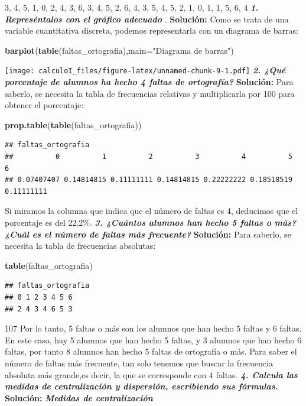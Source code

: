 \documentclass[12pt,]{report}
\newenvironment{Shaded}{\begin{snugshade}}{\end{snugshade}}
\newcommand{\DataTypeTok}[1]{\textcolor[rgb]{0.13,0.29,0.53}{#1}}
\newcommand{\KeywordTok}[1]{\textcolor[rgb]{0.13,0.29,0.53}{\textbf{#1}}}
\newcommand{\NormalTok}[1]{#1}
\newcommand{\StringTok}[1]{\textcolor[rgb]{0.31,0.60,0.02}{#1}}
\theoremstyle{slplain}
\begin{document}
3, 4, 5, 1, 0, 2, 4, 3, 6, 3, 4, 5, 2, 6, 4, 3, 5, 4, 5, 2, 1, 0, 1, 1, 5, 6, 4
\textbf{\emph{1. Represéntalos con el gráfico adecuado}} .
\textbf{Solución:}
Como se trata de una variable cuantitativa discreta, podemos representarla con un diagrama
de barras:

\begin{Shaded}
\begin{Highlighting}[]
\KeywordTok{barplot}\NormalTok{(}\KeywordTok{table}\NormalTok{(faltas_ortografia),}\DataTypeTok{main=}\StringTok{"Diagrama de barras"}\NormalTok{)}
\end{Highlighting}
\end{Shaded}

\texttt{[image: calculoI\_files/figure-latex/unnamed-chunk-9-1.pdf]}
\textbf{\emph{2. ¿Qué porcentaje de alumnos ha hecho 4 faltas de ortografía? }}
\textbf{Solución:}
Para saberlo, se necesita la tabla de frecuencias relativas y multiplicarla por 100 para obtener
el porcentaje:

\begin{Shaded}
\begin{Highlighting}[]
\KeywordTok{prop.table}\NormalTok{(}\KeywordTok{table}\NormalTok{(faltas_ortografia))}
\end{Highlighting}
\end{Shaded}

\begin{verbatim}
## faltas_ortografia
##          0          1          2          3          4          5          6 
## 0.07407407 0.14814815 0.11111111 0.14814815 0.22222222 0.18518519 0.11111111
\end{verbatim}

Si miramos la columna que indica que el número de faltas es 4, deducimos que el porcentaje es
del 22,2\%.
\textbf{\emph{3. ¿Cuántos alumnos han hecho 5 faltas o más?¿Cuál es el número de faltas más
frecuente?}}
\textbf{Solución:}
Para saberlo, se necesita la tabla de frecuencias absolutas:

\begin{Shaded}
\begin{Highlighting}[]
\KeywordTok{table}\NormalTok{(faltas_ortografia)}
\end{Highlighting}
\end{Shaded}

\begin{verbatim}
## faltas_ortografia
## 0 1 2 3 4 5 6 
## 2 4 3 4 6 5 3
\end{verbatim}

107
Por lo tanto, 5 faltas o más son los alumnos que han hecho 5 faltas y 6 faltas. En este caso, hay 5
alumnos que han hecho 5 faltas, y 3 alumnos que han hecho 6 faltas, por tanto 8 alumnos
han hecho 5 faltas de ortografía o más.
Para saber el número de faltas más frecuente, tan solo tenemos que buscar la frecuencia
absoluta más grande,es decir, la que se corresponde con 4 faltas.
\textbf{\emph{4. Calcula las medidas de centralización y dispersión, escribiendo sus fórmulas.}}
\textbf{Solución:}
\textbf{\emph{Medidas de centralización}}
\end{document}
